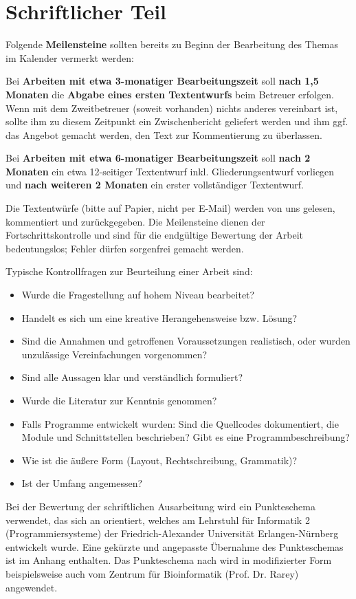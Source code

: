 \documentclass[
    12pt,
    headings=small,
    parskip=half,           %
    bibliography=totoc,
    numbers=noenddot,       %
    open=any,               %
    ]{scrreprt}
\begin{document}
\section{Schriftlicher Teil}

Folgende \textbf{Meilensteine} sollten bereits zu Beginn der Bearbeitung des Themas im Kalender vermerkt werden:

Bei \textbf{Arbeiten mit etwa 3-monatiger Bearbeitungszeit} soll \textbf{nach 1,5 Monaten} die \textbf{Abgabe eines ersten Textentwurfs} beim Betreuer erfolgen. Wenn mit dem Zweitbetreuer (soweit vorhanden) nichts anderes vereinbart ist, sollte ihm zu diesem Zeitpunkt ein Zwischenbericht geliefert werden und ihm ggf. das Angebot gemacht werden, den Text zur Kommentierung zu überlassen.

Bei \textbf{Arbeiten mit etwa 6-monatiger Bearbeitungszeit} soll \textbf{nach 2 Monaten} ein etwa 12-seitiger Textentwurf inkl. Gliederungsentwurf vorliegen und \textbf{nach weiteren 2 Monaten} ein erster vollständiger Textentwurf.

Die Textentwürfe (bitte auf Papier, nicht per E-Mail) werden von uns gelesen, kommentiert und zurückgegeben. Die Meilensteine dienen der Fortschrittskontrolle und sind für die endgültige Bewertung der Arbeit bedeutungslos; Fehler dürfen sorgenfrei gemacht werden.

Typische Kontrollfragen zur Beurteilung einer Arbeit sind:
\begin{itemize}
	\item Wurde die Fragestellung auf hohem Niveau bearbeitet?
	\item Handelt es sich um eine kreative Herangehensweise bzw. Lösung?
	\item Sind die Annahmen und getroffenen Voraussetzungen realistisch, oder wurden unzulässige Vereinfachungen vorgenommen?
	\item Sind alle Aussagen klar und verständlich formuliert?
	\item Wurde die Literatur zur Kenntnis genommen?
	\item Falls Programme entwickelt wurden: Sind die Quellcodes dokumentiert, die Module und Schnittstellen beschrieben? Gibt es eine Programmbeschreibung?
	\item Wie ist die äußere Form (Layout, Rechtschreibung, Grammatik)?
	\item Ist der Umfang angemessen?
\end{itemize}

Bei der Bewertung der schriftlichen Ausarbeitung wird ein Punkteschema verwendet, das sich an \cite{faui2} orientiert, welches am Lehrstuhl für Informatik 2 (Programmiersysteme) der Friedrich-Alexander Universität Erlangen-Nürnberg entwickelt wurde. Eine gekürzte und angepasste Übernahme des Punkteschemas ist im Anhang enthalten. Das Punkteschema nach \cite{faui2} wird in modifizierter Form beispielsweise auch vom Zentrum für Bioinformatik (Prof. Dr. Rarey) angewendet.
\end{document}
